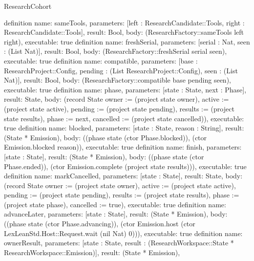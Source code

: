 \begin{lexlean}{ResearchCohort}
\begin{semanticmodule}
{}
definition{
 name: sameTools,
 parameters: [left : ResearchCandidate::Tools, right : ResearchCandidate::Tools],
 result: Bool,
 body: (ResearchFactory::sameTools left right),
 executable: true
}
definition{
 name: freshSerial,
 parameters: [serial : Nat, seen : (List Nat)],
 result: Bool,
 body: (ResearchFactory::freshSerial serial seen),
 executable: true
}
definition{
 name: compatible,
 parameters: [base : ResearchProject::Config, pending : (List ResearchProject::Config), seen : (List Nat)],
 result: Bool,
 body: (ResearchFactory::compatible base pending seen),
 executable: true
}
definition{
 name: phase,
 parameters: [state : State, next : Phase],
 result: State,
 body: (record State {owner := (project state owner), active := (project state active), pending := (project state pending), results := (project state results), phase := next, cancelled := (project state cancelled)}),
 executable: true
}
definition{
 name: blocked,
 parameters: [state : State, reason : String],
 result: (State * Emission),
 body: ((phase state (ctor Phase.blocked)), (ctor Emission.blocked reason)),
 executable: true
}
definition{
 name: finish,
 parameters: [state : State],
 result: (State * Emission),
 body: ((phase state (ctor Phase.ended)), (ctor Emission.complete (project state results))),
 executable: true
}
definition{
 name: markCancelled,
 parameters: [state : State],
 result: State,
 body: (record State {owner := (project state owner), active := (project state active), pending := (project state pending), results := (project state results), phase := (project state phase), cancelled := true}),
 executable: true
}
definition{
 name: advanceLater,
 parameters: [state : State],
 result: (State * Emission),
 body: ((phase state (ctor Phase.advancing)), (ctor Emission.host (ctor LexLeanStd.Host::Request.wait (nil Nat) 0))),
 executable: true
}
definition{
 name: ownerResult,
 parameters: [state : State, result : (ResearchWorkspace::State * ResearchWorkspace::Emission)],
 result: (State * Emission),
}
\end{semanticmodule}
\end{lexlean}
